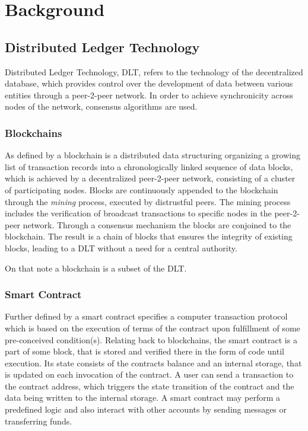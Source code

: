 \chapter{Background}
\label{chap:Background}


\section{Distributed Ledger Technology} %
\label{sec:Distributed Ledger Technology}

Distributed Ledger Technology, DLT, refers to the technology of the decentralized database, which provides control over
the development of data between various entities through a peer-2-peer network. In order to achieve synchronicity across
nodes of the network, consensus algorithms are used.

\subsection{Blockchains} %
\label{sub:Blockchains}
As defined by \cite{diam-iot-2020} a blockchain is a distributed data structuring organizing a growing list of
transaction records into a chronologically linked sequence of data blocks, which is achieved by a decentralized
peer-2-peer network, consisting of a cluster of participating nodes. Blocks are continuously appended to the blockchain
through the \textit{mining} process, executed by distrustful peers. The mining process includes the verification of
broadcast transactions to specific nodes in the peer-2-peer network. Through a consensus mechanism the blocks are
conjoined to the blockchain. The result is a chain of blocks that ensures the integrity of existing blocks, leading to a
DLT without a need for a central authority.

On that note a blockchain is a subset of the DLT. \cite{diam-iot-2020}

\subsection{Smart Contract} %
\label{sec:Smart Contract}
Further defined by \cite{diam-iot-2020} a smart contract specifies a computer transaction protocol which is based on the
execution of terms of the contract upon fulfillment of some pre-conceived condition(s).
Relating back to blockchains, the smart contract is a part of some block, that is stored and verified there in the form
of code until execution. Its state consists of the contracts balance and an internal storage, that is updated on each
invocation of the contract. A user can send a transaction to the contract address, which triggers the state transition
of the contract and the data being written to the internal storage. A smart contract may perform a predefined logic and
also interact with other accounts by sending messages or transferring funds.

